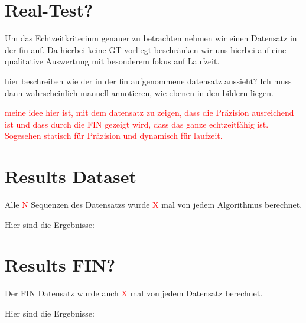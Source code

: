 \documentclass[main.tex]{subfiles}
\begin{document}
\section{Real-Test?}
Um das Echtzeitkriterium genauer zu betrachten nehmen wir einen Datensatz in der fin auf.
Da hierbei keine GT vorliegt beschränken wir uns hierbei auf eine qualitative Auswertung mit besonderem fokus auf Laufzeit.


hier beschreiben wie der in der fin aufgenommene datensatz aussieht?
Ich muss dann wahrscheinlich manuell annotieren, wie ebenen in den bildern liegen.

\textcolor{red}{meine idee hier ist, mit dem datensatz zu zeigen, dass die Präzision ausreichend ist und dass durch
    die FIN gezeigt wird, dass das ganze echtzeitfähig ist. Sogesehen statisch für Präzision und dynamisch für laufzeit.}

\section{Results Dataset}

Alle \textcolor{red}{N} Sequenzen des Datensatzs wurde \textcolor{red}{X} mal von jedem Algorithmus berechnet.

Hier sind die Ergebnisse:

\section{Results FIN?}

Der FIN Datensatz wurde auch \textcolor{red}{X} mal von jedem Datensatz berechnet.

Hier sind die Ergebnisse:
\end{document}
